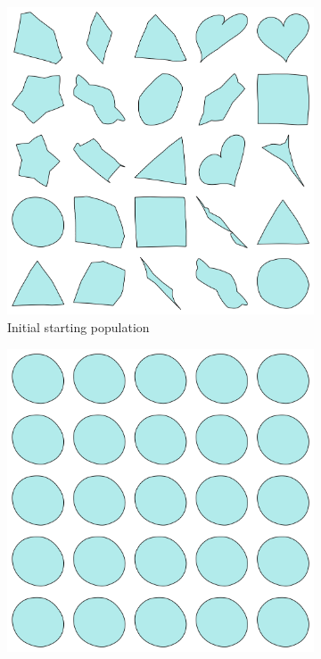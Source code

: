 \documentclass{article}
\begin{document}
\begin{figure}[H]
    \centering
    \begin{subfigure}[b]{0.32\textwidth}
        \centering
        \includegraphics[width=\textwidth]{figures/GAResults/GA11/50_init_pop.png}
        \caption{Initial starting population}
        \label{fig:GA11_starting}
    \end{subfigure}
    \hfill
    \begin{subfigure}[b]{0.32\textwidth}
        \centering
        \includegraphics[width=\textwidth]{figures/GAResults/GA11/latent/final_generation.png}

\end{subfigure}
\end{figure}
\end{document}

